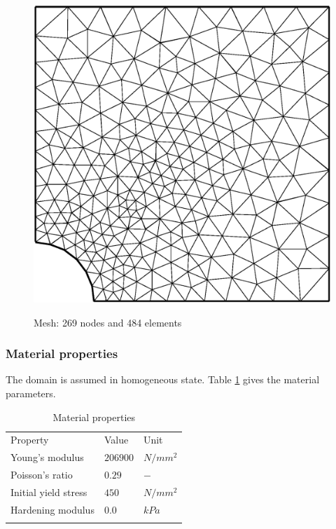\begin{figure}[!htb]
\centering
    \includegraphics[scale=0.3]{M/ex1_mesh_gfem.eps}\\
   \caption{Mesh: 269 nodes and 484 elements}
  \label{ex1_mesh}
\end{figure}

\subsubsection*{Material properties}

The domain is assumed in homogeneous state. Table \ref{ex1_table1}
gives the material parameters\cite{SteEtAl:03}.

\begin{table}[!thb]
\centering
\caption{Material properties}
\label{ex1_table1}
\begin{tabular}{lll}
\hline\hline\noalign{\smallskip}
Property & Value & Unit \\
\noalign{\smallskip}\hline\noalign{\smallskip}
Young's modulus & $206900$  & $N/mm^2$ \\
Poisson's ratio & $0.29$       & $-$ \\
Initial yield stress & $450$       & $N/mm^2$ \\
Hardening modulus & $0.0$       & $kPa$ \\
\noalign{\smallskip}\hline\hline
\end{tabular}
\end{table}

